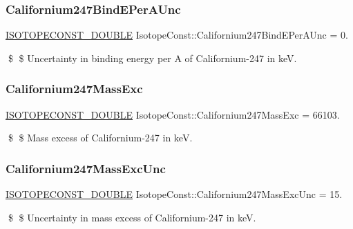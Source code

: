 \subsubsection{\texorpdfstring{Californium247\+Bind\+E\+Per\+A\+Unc}{Californium247BindEPerAUnc}}
{\footnotesize\ttfamily \mbox{\hyperlink{group___isotope_const-_macros_ga8f45a7272ce02c0b4c65c44636ed719a}{I\+S\+O\+T\+O\+P\+E\+C\+O\+N\+S\+T\+\_\+\+D\+O\+U\+B\+LE}} Isotope\+Const\+::\+Californium247\+Bind\+E\+Per\+A\+Unc = 0.}

\$ \$ Uncertainty in binding energy per A of Californium-\/247 in keV. \mbox{\label{group___isotope_const-_californium-_cf247_ga35a2ee267f23f7c5a746d2d65b7d69c2}} 
\subsubsection{\texorpdfstring{Californium247\+Mass\+Exc}{Californium247MassExc}}
{\footnotesize\ttfamily \mbox{\hyperlink{group___isotope_const-_macros_ga8f45a7272ce02c0b4c65c44636ed719a}{I\+S\+O\+T\+O\+P\+E\+C\+O\+N\+S\+T\+\_\+\+D\+O\+U\+B\+LE}} Isotope\+Const\+::\+Californium247\+Mass\+Exc = 66103.}

\$ \$ Mass excess of Californium-\/247 in keV. \mbox{\label{group___isotope_const-_californium-_cf247_ga9f158e69fbfa909a2ad0833927c2bb5e}} 
\subsubsection{\texorpdfstring{Californium247\+Mass\+Exc\+Unc}{Californium247MassExcUnc}}
{\footnotesize\ttfamily \mbox{\hyperlink{group___isotope_const-_macros_ga8f45a7272ce02c0b4c65c44636ed719a}{I\+S\+O\+T\+O\+P\+E\+C\+O\+N\+S\+T\+\_\+\+D\+O\+U\+B\+LE}} Isotope\+Const\+::\+Californium247\+Mass\+Exc\+Unc = 15.}

\$ \$ Uncertainty in mass excess of Californium-\/247 in keV. \mbox{\label{group___isotope_const-_californium-_cf247_gaaa55385f219df35dae20f708193e9ab5}} 
